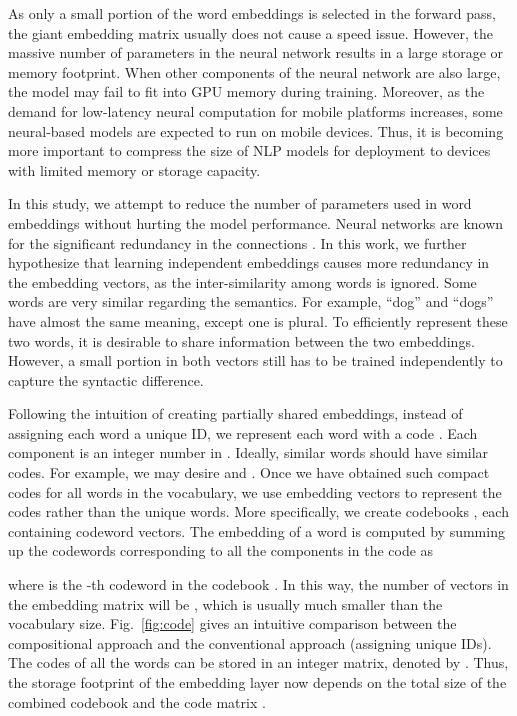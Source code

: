 \documentclass{article} \usepackage{iclr2018_conference_review,times}
\begin{document}
As only a small portion of the word embeddings is selected in the forward pass, the giant embedding matrix usually does not cause a speed issue. However, the massive number of parameters in the neural network results in a large storage or memory footprint. When other components of the neural network are also large, the model may fail to fit into GPU memory during training.
Moreover, as the demand for low-latency neural computation for mobile platforms increases, some neural-based models are expected to run on mobile devices. Thus, it is becoming more important to compress the size of NLP models for deployment to devices with limited memory or storage capacity. 

In this study, we attempt to reduce the number of parameters used in word embeddings without hurting the model performance. Neural networks are known for the significant redundancy in the connections \citep{Denil2013PredictingPI}. In this work, we further hypothesize that learning independent embeddings causes more redundancy in the embedding vectors, as the inter-similarity among words is ignored. Some words are very similar regarding the semantics. For example, ``dog'' and ``dogs'' have almost the same meaning, except one is plural. To efficiently represent these two words, it is desirable to share information between the two embeddings. However, a small portion in both vectors still has to be trained independently to capture the syntactic difference.

Following the intuition of creating partially shared embeddings, instead of assigning each word a unique ID, we represent each word  with a code . Each component  is an integer number in . Ideally, similar words should have similar codes. For example, we may desire  and . Once we have obtained such compact codes for all words in the vocabulary, we use embedding vectors to represent the codes rather than the unique words. More specifically, we create  codebooks , each containing  codeword vectors. The embedding of a word is computed by summing up the codewords corresponding to all the components in the code as

where  is the -th codeword in the codebook . In this way, the number of vectors in the embedding matrix will be , which is usually much smaller than the vocabulary size. Fig.~\ref{fig:code} gives an intuitive comparison between the compositional approach and the conventional approach (assigning unique IDs). The codes of all the words can be stored in an integer matrix, denoted by . Thus, the storage footprint of the embedding layer now depends on the total size of the combined codebook  and the code matrix .
\end{document}
